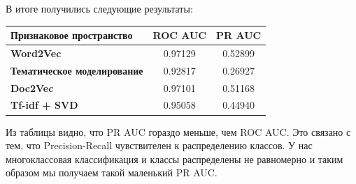 \documentclass[12pt, a4paper]{article}
\begin{document}
            В итоге получились следующие результаты:

            \begin{center}
            \begin{tabular}{| l | c | c |}
                \hline
                \textbf{Признаковое пространство} & \textbf{ROC AUC} & \textbf{PR AUC} \\
                \hline
                \textbf{Word2Vec} & 0.97129 & 0.52899 \\
                \textbf{Тематическое моделирование} & 0.92817 & 0.26927 \\
                \textbf{Doc2Vec} & 0.97101 & 0.51168 \\
                \textbf{Tf-idf + SVD} & 0.95058 & 0.44940 \\
                \hline
            \end{tabular}
            \end{center}

            Из таблицы видно, что PR AUC гораздо меньше, чем ROC AUC. Это связано с тем, что Precision-Recall чувствителен к распределению классов. У нас многоклассовая классификация и классы распределены не равномерно и таким образом мы получаем такой маленький PR AUC.
\end{document}

